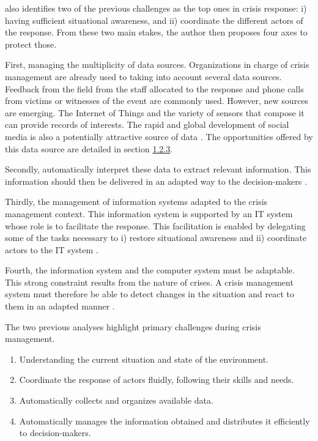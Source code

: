 \textcite{batardIntegrerContributionsCitoyennes2021} also identifies two of the previous challenges as the top ones in crisis response: i) having sufficient situational awareness, and ii) coordinate the different actors of the response.
From these two main stakes, the author then proposes four axes to protect those.

First, managing the multiplicity of data sources.
Organizations in charge of crisis management are already used to taking into account several data sources.
Feedback from the field from the staff allocated to the response and phone calls from victims or witnesses of the event are commonly used.
However, new sources are emerging.
The Internet of Things and the variety of sensors that compose it can provide records of interests.
The rapid and global development of social media is also a potentially attractive source of data \parencite{meierStrengtheningHumanitarianInformation2013}.
The opportunities offered by this data source are detailed in section \hyperref[sec:nlp]{1.2.3}.

Secondly, automatically interpret these data to extract relevant information.
This information should then be delivered in an adapted way to the decision-makers \parencite{luokkalaDevelopingInformationSystems2014,vandewalleImprovingSituationAwareness2016}.

Thirdly, the management of information systems adapted to the crisis management context.
This information system is supported by an IT system whose role is to facilitate the response.
This facilitation is enabled by delegating some of the tasks necessary to i) restore situational awareness and ii) coordinate actors to the IT system \parencite{benabenManagementCollaborativeBehavior2015}.

Fourth, the information system and the computer system must be adaptable.
This strong constraint results from the nature of crises.
A crisis management system must therefore be able to detect changes in the situation and react to them in an adapted manner \parencite{barthe-delanoeEventdrivenAgilityInteroperability2014,charlesModelDefineAssess2010}.

The two previous analyses highlight primary challenges during crisis management.

\begin{enumerate}
    \item Understanding the current situation and state of the environment.
    \item Coordinate the response of actors fluidly, following their skills and needs.
    \item Automatically collects and organizes available data.
    \item Automatically manages the information obtained and distributes it efficiently to decision-makers.
\end{enumerate}

